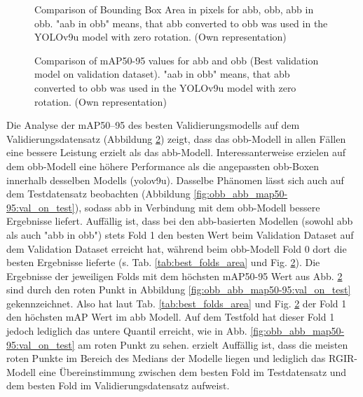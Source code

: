 \begin{figure}[htbp]
    \centering
    
    \caption[Comparison of Bounding Box Area in pixels for \acrshort{abb}, \acrshort{obb}, abb in obb]{Comparison of Bounding Box Area in pixels for \acrshort{abb}, \acrshort{obb}, abb in obb. "aab in obb" means, that \acrlong{abb} converted to obb was used in the \acrshort{YOLO}v9u model with zero rotation. (Own representation)}
    \label{fig:bbox_area}
\end{figure}


\begin{figure}[htbp]
    \centering
    
    \caption[Comparison of \acrshort{mAP}50-95 values for \acrshort{abb} and \acrshort{obb} (Best validation model on validation dataset)]{Comparison of \acrshort{mAP}50-95 values for \acrshort{abb} and \acrshort{obb} (Best validation model on validation dataset). "aab in obb" means, that \acrlong{abb} converted to obb was used in the \acrshort{YOLO}v9u model with zero rotation. (Own representation)}
    \label{fig:obb_abb_map50-95:val_on_val}
\end{figure}
Die Analyse der \acrshort{mAP}50--95 des besten Validierungsmodells auf dem Validierungsdatensatz (Abbildung \ref{fig:obb_abb_map50-95:val_on_val}) zeigt, dass das \acrshort{obb}-Modell in allen Fällen eine bessere Leistung erzielt als das \acrshort{abb}-Modell. Interessanterweise erzielen  auf dem \acrshort{obb}-Modell eine höhere Performance als die angepassten \acrshort{obb}-Boxen innerhalb desselben Modells (yolov9u). Dasselbe Phänomen lässt sich auch auf dem Testdatensatz beobachten (Abbildung \ref{fig:obb_abb_map50-95:val_on_test}), sodass \acrshort{abb} in Verbindung mit dem \acrshort{obb}-Modell bessere Ergebnisse liefert. Auffällig ist, dass bei den \acrshort{abb}-basierten Modellen (sowohl \acrshort{abb} als auch "abb in obb") stets Fold 1 den besten Wert beim Validation Dataset auf dem Validation Dataset erreicht hat, während beim \acrshort{obb}-Modell Fold 0 dort die besten Ergebnisse lieferte (s. Tab. \ref{tab:best_folds_area} und Fig. \ref{fig:obb_abb_map50-95:val_on_val}). Die Ergebnisse der jeweiligen Folds mit dem höchsten \acrshort{mAP}50-95 Wert aus Abb. \ref{fig:obb_abb_map50-95:val_on_val} sind durch den roten Punkt in Abbildung \ref{fig:obb_abb_map50-95:val_on_test} gekennzeichnet. Also hat laut Tab. \ref{tab:best_folds_area} und Fig. \ref{fig:obb_abb_map50-95:val_on_val} der Fold 1 den höchsten \acrshort{mAP} Wert im \acrshort{abb} Modell. Auf dem Testfold hat dieser Fold 1 jedoch lediglich das untere Quantil erreicht, wie in Abb. \ref{fig:obb_abb_map50-95:val_on_test} am roten Punkt zu sehen. erzielt Auffällig ist, dass die meisten roten Punkte im Bereich des Medians der Modelle liegen und lediglich das \acrshort{RGIR}-Modell eine Übereinstimmung zwischen dem besten Fold im Testdatensatz und dem besten Fold im Validierungsdatensatz aufweist. 


